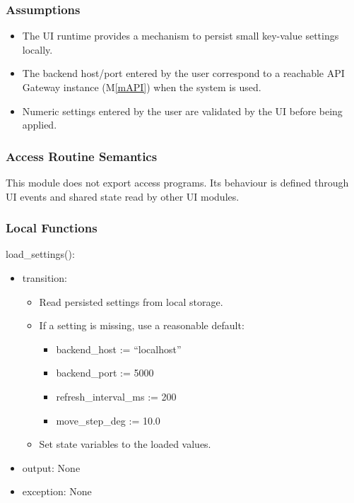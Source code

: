 \documentclass[12pt, titlepage]{article}
\newcommand{\mref}[1]{M\ref{#1}}
\begin{document}
\subsubsection{Assumptions}

\begin{itemize}
  \item The UI runtime provides a mechanism to persist small key-value settings
        locally.
  \item The backend host/port entered by the user correspond to a reachable API Gateway
        instance (\mref{mAPI}) when the system is used.
  \item Numeric settings entered by the user are validated by the UI before being
        applied.
\end{itemize}

\subsubsection{Access Routine Semantics}

This module does not export access programs. Its behaviour is defined through
UI events and shared state read by other UI modules.

\subsubsection{Local Functions}

\noindent load\_settings():
\begin{itemize}
  \item transition:
        \begin{itemize}
          \item Read persisted settings from local storage.
          \item If a setting is missing, use a reasonable default:
                \begin{itemize}
                  \item backend\_host := ``localhost''
                  \item backend\_port := 5000
                  \item refresh\_interval\_ms := 200
                  \item move\_step\_deg := 10.0
                \end{itemize}
          \item Set state variables to the loaded values.
        \end{itemize}
  \item output: None
  \item exception: None
\end{itemize}
\end{document}
